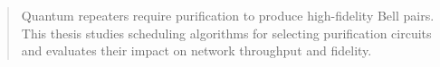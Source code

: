 \begin{abstract}

Quantum repeaters require purification to produce high-fidelity Bell pairs.
This thesis studies scheduling algorithms for selecting purification circuits
and evaluates their impact on network throughput and fidelity.

\end{abstract}